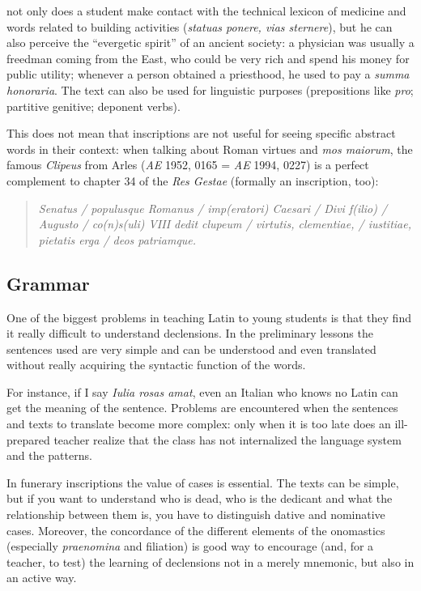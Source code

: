 \documentclass[amsthm,ebook]{saparticle}
\begin{document}
not only does a student make contact with the technical lexicon of medicine and words related to building activities
(\emph{statuas ponere, vias sternere}), but he can also perceive the ``evergetic spirit'' of an ancient society: a physician was
usually a freedman coming from the East, who could be very rich and spend his money for public utility; whenever a
person obtained a priesthood, he used to pay a \emph{summa honoraria}. The text can also be used for linguistic purposes
(prepositions like \emph{pro}; partitive genitive; deponent verbs).

This does not mean that inscriptions are not useful for seeing specific abstract words in their context: when talking
about Roman virtues and \emph{mos maiorum}, the famous \emph{Clipeus} from Arles (\emph{AE} 1952, 0165 = \emph{AE} 1994, 0227) is a
perfect complement to chapter 34 of the \emph{Res Gestae} (formally an inscription, too): \begin{quotation}
\emph{Senatus / populusque Romanus /
imp(eratori) Caesari / Divi f(ilio) / Augusto / co(n)s(uli) VIII dedit clupeum / virtutis, clementiae, / iustitiae,
pietatis erga / deos patriamque.}

\end{quotation}



\subsection{Grammar}
\noindent One of the biggest problems in teaching Latin to young students is that they find it really difficult to understand
declensions. In the preliminary lessons the sentences used are very simple and can be understood and even translated
without really acquiring the syntactic function of the words.

For instance, if I say\emph{ Iulia rosas amat}, even an Italian who knows no Latin can get the meaning of the sentence.
Problems are encountered when the sentences and texts to translate become more complex: only when it is too late does
an ill-prepared teacher realize that the class has not internalized the language system and the patterns.

In funerary inscriptions the value of cases is essential. The texts can be simple, but if you want to understand who is
dead, who is the dedicant and what the relationship between them is, you have to distinguish dative and nominative
cases. Moreover, the concordance of the different elements of the onomastics (especially \emph{praenomina} and filiation) is
good way to encourage (and, for a teacher, to test) the learning of declensions not in a merely mnemonic, but also in
an active way.
\end{document}
